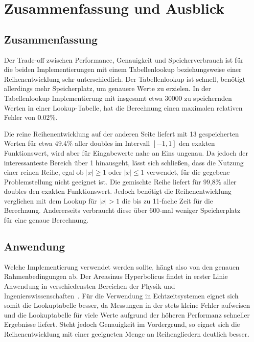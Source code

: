 \documentclass[course=erap] {aspdoc}
\begin{document}
    \section{Zusammenfassung und Ausblick}

    \subsection{Zusammenfassung}
    Der Trade-off zwischen Performance, Genauigkeit und Speicherverbrauch ist für die beiden Implementierungen mit einem Tabellenlookup beziehungsweise einer Reihenentwicklung sehr unterschiedlich.
    Der Tabellenlookup ist schnell, benötigt allerdings mehr Speicherplatz, um genauere Werte zu erzielen.
    In der Tabellenlookup Implementierung mit insgesamt etwa 30000 zu speichernden Werten in einer Lookup-Tabelle, hat die Berechnung einen maximalen relativen Fehler von 0.02\%.

    Die reine Reihenentwicklung auf der anderen Seite liefert mit 13 gespeicherten Werten für etwa 49.4\% aller doubles im Intervall $[-1, 1]$ den exakten Funktionswert, wird aber für Eingabewerte nahe an Eins ungenau.
    Da jedoch der interessanteste Bereich über 1 hinausgeht, lässt sich schließen, dass die Nutzung einer reinen Reihe, egal ob $|x|\geq1$ oder $|x|\leq1$ verwendet, für die gegebene Problemstellung nicht geeignet ist.
    Die gemischte Reihe liefert für 99,8\% aller doubles den exakten Funktionswert.
    Jedoch benötigt die Reihenentwicklung verglichen mit dem Lookup für $|x|>1$ die bis zu 11-fache Zeit für die Berechnung.
    Andererseits verbraucht diese über 600-mal weniger Speicherplatz für eine genaue Berechnung.

    \subsection{Anwendung}
    Welche Implementierung verwendet werden sollte, hängt also von den genauen Rahmenbedingungen ab.
    Der Areasinus Hyperbolicus findet in erster Linie Anwendung in verschiedensten Bereichen der Physik und Ingenierswissenschaften~\cite{????}.
    Für die Verwendung in Echtzeitsystemen eignet sich somit die Lookuptabelle besser, da Messungen in der stets kleine Fehler aufweisen und die Lookuptabelle für viele Werte aufgrund der höheren Performanz schneller Ergebnisse liefert.
    Steht jedoch Genauigkeit im Vordergrund, so eignet sich die Reihenentwicklung mit einer geeigneten Menge an Reihengliedern deutlich besser.
\end{document}
